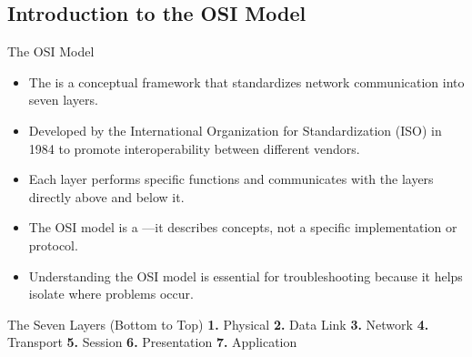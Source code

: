 \documentclass[aspectratio=169]{beamer}  %
\begin{document}
\subsection{Introduction to the OSI Model}

\begin{frame}{The OSI Model}
    \begin{itemize}
        \item The  is a conceptual framework that standardizes network communication into seven layers.
        \item Developed by the International Organization for Standardization (ISO) in 1984 to promote interoperability between different vendors.
        \item Each layer performs specific functions and communicates with the layers directly above and below it.
        \item The OSI model is a ---it describes concepts, not a specific implementation or protocol.
        \item Understanding the OSI model is essential for troubleshooting because it helps isolate where problems occur.
    \end{itemize}
    
    \begin{block}{The Seven Layers (Bottom to Top)}
        \centering
        \textbf{1.} Physical \quad \textbf{2.} Data Link \quad \textbf{3.} Network \quad \textbf{4.} Transport \quad \textbf{5.} Session \quad \textbf{6.} Presentation \quad \textbf{7.} Application
    \end{block}
\end{frame}
\end{document}
